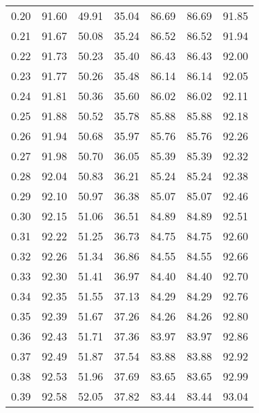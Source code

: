 \begin{tabular}{|c|c|c|c|c|c|c|}
      0.20 &     91.60 &     49.91 &      35.04 &   86.69 &      86.69 &         91.85 \\
      0.21 &     91.67 &     50.08 &      35.24 &   86.52 &      86.52 &         91.94 \\
      0.22 &     91.73 &     50.23 &      35.40 &   86.43 &      86.43 &         92.00 \\
      0.23 &     91.77 &     50.26 &      35.48 &   86.14 &      86.14 &         92.05 \\
      0.24 &     91.81 &     50.36 &      35.60 &   86.02 &      86.02 &         92.11 \\
      0.25 &     91.88 &     50.52 &      35.78 &   85.88 &      85.88 &         92.18 \\
      0.26 &     91.94 &     50.68 &      35.97 &   85.76 &      85.76 &         92.26 \\
      0.27 &     91.98 &     50.70 &      36.05 &   85.39 &      85.39 &         92.32 \\
      0.28 &     92.04 &     50.83 &      36.21 &   85.24 &      85.24 &         92.38 \\
      0.29 &     92.10 &     50.97 &      36.38 &   85.07 &      85.07 &         92.46 \\
      0.30 &     92.15 &     51.06 &      36.51 &   84.89 &      84.89 &         92.51 \\
      0.31 &     92.22 &     51.25 &      36.73 &   84.75 &      84.75 &         92.60 \\
      0.32 &     92.26 &     51.34 &      36.86 &   84.55 &      84.55 &         92.66 \\
      0.33 &     92.30 &     51.41 &      36.97 &   84.40 &      84.40 &         92.70 \\
      0.34 &     92.35 &     51.55 &      37.13 &   84.29 &      84.29 &         92.76 \\
      0.35 &     92.39 &     51.67 &      37.26 &   84.26 &      84.26 &         92.80 \\
      0.36 &     92.43 &     51.71 &      37.36 &   83.97 &      83.97 &         92.86 \\
      0.37 &     92.49 &     51.87 &      37.54 &   83.88 &      83.88 &         92.92 \\
      0.38 &     92.53 &     51.96 &      37.69 &   83.65 &      83.65 &         92.99 \\
      0.39 &     92.58 &     52.05 &      37.82 &   83.44 &      83.44 &         93.04 \\

\end{tabular}

